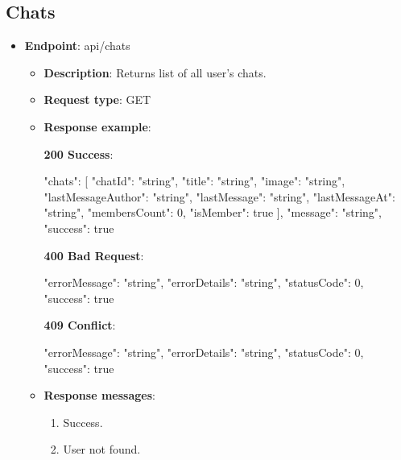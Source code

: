 \subsection{Chats}\label{subsec:chats}
\begin{itemize}
    \item \textbf{Endpoint}: api/chats
    \begin{itemize}
        \item \textbf{Description}: Returns list of all user's chats.
        \item \textbf{Request type}: GET
        \item \textbf{Response example}:

        \textbf{200 Success}:

        \begin{spverbatim}
        {
            "chats": [
                {
                "chatId": "string",
                "title": "string",
                "image": "string",
                "lastMessageAuthor": "string",
                "lastMessage": "string",
                "lastMessageAt": "string",
                "membersCount": 0,
                "isMember": true
            }
            ],
            "message": "string",
            "success": true
        }
        \end{spverbatim}

        \textbf{400 Bad Request}:

        \begin{spverbatim}
        {
            "errorMessage": "string",
            "errorDetails": "string",
            "statusCode": 0,
            "success": true
        }
        \end{spverbatim}

        \textbf{409 Conflict}:

        \begin{spverbatim}
        {
            "errorMessage": "string",
            "errorDetails": "string",
            "statusCode": 0,
            "success": true
        }
        \end{spverbatim}

        \item \textbf{Response messages}:
        \begin{enumerate}
            \item Success.
            \item User not found.
        \end{enumerate}
    \end{itemize}


\end{itemize}
